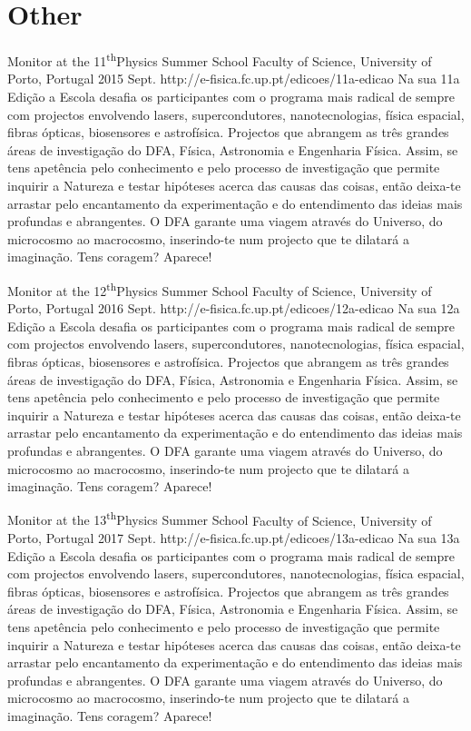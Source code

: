 \section{Other}	\label{app_sec:other}

{Monitor at the 11\textsuperscript{th}Physics Summer School}
{Faculty of Science, University of Porto, Portugal}%
{2015 Sept.}%
{http://e-fisica.fc.up.pt/edicoes/11a-edicao}%
{}%
{Na sua 11a Edição a Escola desafia os participantes com o programa mais radical de sempre com projectos envolvendo lasers, supercondutores, nanotecnologias, física espacial, fibras ópticas, biosensores e astrofísica. Projectos que abrangem as três grandes áreas de investigação do DFA, Física, Astronomia e Engenharia Física. Assim, se tens apetência pelo conhecimento e pelo processo de investigação que permite inquirir a Natureza e testar hipóteses acerca das causas das coisas, então deixa-te arrastar pelo encantamento da experimentação e do entendimento das ideias mais profundas e abrangentes. O DFA garante uma viagem através do Universo, do microcosmo ao macrocosmo, inserindo-te num projecto que te dilatará a imaginação. Tens coragem? Aparece!}%


{Monitor at the 12\textsuperscript{th}Physics Summer School}
{Faculty of Science, University of Porto, Portugal}%
{2016 Sept.}%
{http://e-fisica.fc.up.pt/edicoes/12a-edicao}%
{}%
{Na sua 12a Edição a Escola desafia os participantes com o programa mais radical de sempre com projectos envolvendo lasers, supercondutores, nanotecnologias, física espacial, fibras ópticas, biosensores e astrofísica. Projectos que abrangem as três grandes áreas de investigação do DFA, Física, Astronomia e Engenharia Física. Assim, se tens apetência pelo conhecimento e pelo processo de investigação que permite inquirir a Natureza e testar hipóteses acerca das causas das coisas, então deixa-te arrastar pelo encantamento da experimentação e do entendimento das ideias mais profundas e abrangentes. O DFA garante uma viagem através do Universo, do microcosmo ao macrocosmo, inserindo-te num projecto que te dilatará a imaginação. Tens coragem? Aparece!}%


{Monitor at the 13\textsuperscript{th}Physics Summer School}
{Faculty of Science, University of Porto, Portugal}%
{2017 Sept.}%
{http://e-fisica.fc.up.pt/edicoes/13a-edicao}%
{}%
{Na sua 13a Edição a Escola desafia os participantes com o programa mais radical de sempre com projectos envolvendo lasers, supercondutores, nanotecnologias, física espacial, fibras ópticas, biosensores e astrofísica. Projectos que abrangem as três grandes áreas de investigação do DFA, Física, Astronomia e Engenharia Física. Assim, se tens apetência pelo conhecimento e pelo processo de investigação que permite inquirir a Natureza e testar hipóteses acerca das causas das coisas, então deixa-te arrastar pelo encantamento da experimentação e do entendimento das ideias mais profundas e abrangentes. O DFA garante uma viagem através do Universo, do microcosmo ao macrocosmo, inserindo-te num projecto que te dilatará a imaginação. Tens coragem? Aparece!}%


